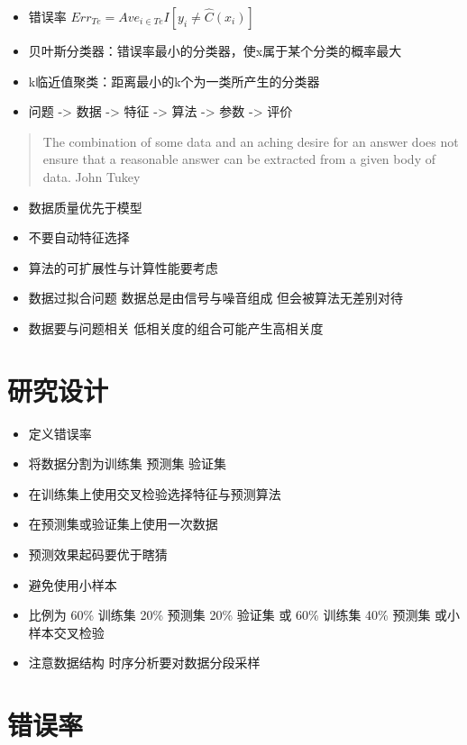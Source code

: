 \documentclass[]{book}
\providecommand{\tightlist}{%
  \setlength{\itemsep}{0pt}\setlength{\parskip}{0pt}}
\begin{document}
\begin{itemize}
\item
  错误率 \(Err_{Te} = Ave_{i \in Te}I[y_i \neq \hat C(x_i)]\)
\item
  贝叶斯分类器：错误率最小的分类器，使x属于某个分类的概率最大
\item
  k临近值聚类：距离最小的k个为一类所产生的分类器
\item
  问题 -\textgreater{} 数据 -\textgreater{} 特征 -\textgreater{} 算法 -\textgreater{} 参数 -\textgreater{} 评价
\end{itemize}

\begin{quote}
The combination of some data and an aching desire for an answer does not ensure that a reasonable answer can be extracted from a given body of data. John Tukey
\end{quote}

\begin{itemize}
\tightlist
\item
  数据质量优先于模型
\item
  不要自动特征选择
\item
  算法的可扩展性与计算性能要考虑
\item
  数据过拟合问题 数据总是由信号与噪音组成 但会被算法无差别对待
\item
  数据要与问题相关 低相关度的组合可能产生高相关度
\end{itemize}

\section{研究设计}

\begin{itemize}
\tightlist
\item
  定义错误率
\item
  将数据分割为训练集 预测集 验证集
\item
  在训练集上使用交叉检验选择特征与预测算法
\item
  在预测集或验证集上使用一次数据
\item
  预测效果起码要优于瞎猜
\item
  避免使用小样本
\item
  比例为 60\% 训练集 20\% 预测集 20\% 验证集 或 60\% 训练集 40\% 预测集 或小样本交叉检验
\item
  注意数据结构 时序分析要对数据分段采样
\end{itemize}

\section{错误率}
\end{document}
